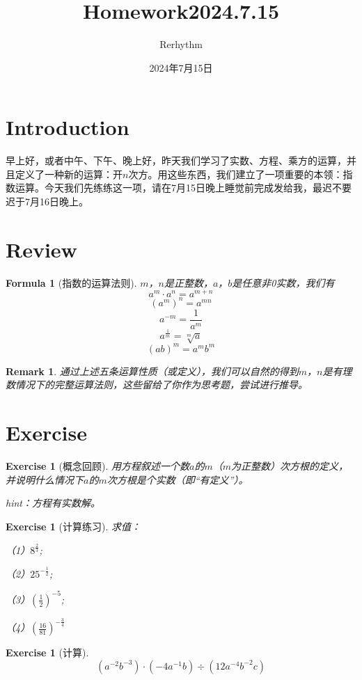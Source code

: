 \documentclass[UTF8]{ctexart}
\title{Homework2024.7.15}
\author{Rerhythm}
\date{2024年7月15日}
\newtheorem{rem}[thm]{Remark}
\newtheorem{exe}[thm]{Exercise}
\newtheorem{for}[thm]{Formula}
\begin{document}
\fancyfoot[C]{\thepage}

\maketitle
\section{Introduction}
早上好，或者中午、下午、晚上好，昨天我们学习了实数、方程、乘方的运算，并且定义了一种新的运算：开$n$次方。用这些东西，我们建立了一项重要的本领：指数运算。今天我们先练练这一项，请在7月15日晚上睡觉前完成发给我，最迟不要迟于7月16日晚上。
\section{Review}
\begin{for}[指数的运算法则]
$m$，$n$是正整数，$a$，$b$是任意非0实数，我们有
    \[a^m\cdot a^n=a^{m+n}\]
    \[(a^m)^n=a^{mn}\]
    \[a^{-m}=\frac{1}{a^m}\]
    \[a^{\frac{1}{m}}=\sqrt[m]{a}\]
    \[(ab)^m=a^mb^m\]
\end{for}
\begin{rem}
    通过上述五条运算性质（或定义），我们可以自然的得到$m$，$n$是有理数情况下的完整运算法则，这些留给了你作为思考题，尝试进行推导。
\end{rem}
\section{Exercise}
\begin{exe}[概念回顾]
    用方程叙述一个数$a$的$m$（$m$为正整数）次方根的定义，并说明什么情况下$a$的$m$次方根是个实数（即“有定义”）。

    hint：方程有实数解。
\end{exe}
\begin{exe}[计算练习]求值：

    （1）$8^{\frac{2}{3}}$;
    
    （2）$25^{-\frac{1}{2}}$;
    
    （3）$(\frac{1}{2})^{-5}$;
    
    （4）$(\frac{16}{81})^{-\frac{3}{4}}$
\end{exe}
\begin{exe}[计算]
    \[(a^{-2}b^{-3})\cdot (-4a^{-1}b)\div (12a^{-4}b^{-2}c)\]
\end{exe}
\end{document}
